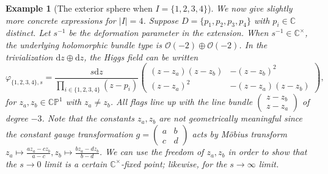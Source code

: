 \documentclass[12pt,letterpaper,reqno]{amsart}
\newtheorem{ex}[thm]{Example}
\theoremstyle{remark}
\theoremstyle{definition}
\numberwithin{thm}{section}
\numberwithin{equation}{section}
\numberwithin{figure}{section}
\newcommand{\cO}{\ensuremath{\mathcal O}}
\newcommand{\C}{\ensuremath{\mathbb C}}
\newcommand{\CP}{\ensuremath{\mathbb {CP}}}
\newcommand{\de}{\mathrm{d}}
\begin{document}
\begin{ex}[The exterior sphere when $I=\{1, 2, 3, 4\}$] We now give slightly more concrete expressions for $|I|=4$. Suppose $D=\{p_1, p_2, p_3, p_4\}$ with $p_i \in \C$ distinct.
Let $s^{-1}$ be the deformation parameter in the extension. When $s^{-1} \in \C^\times$, the underlying holomorphic bundle type is $\cO(-2) \oplus \cO(-2)$.
In the trivialization $\de z \oplus \de z$, the Higgs field can be written 
\[ \varphi_{\{1, 2, 3, 4\}, s}= \frac{s \de z}{\prod_{i \in \{1, 2, 3, 4\}}(z-p_i)} \begin{pmatrix}(z-z_a)(z-z_b)& -(z-z_b)^2 \\ (z-z_a)^2 & -(z-z_a)(z-z_b) \end{pmatrix},\]
for $z_a, z_b \in \CP^1$ with  $z_a \neq z_b$. All flags line up with the line bundle $\begin{pmatrix} z-z_b\\z-z_a \end{pmatrix}$ of degree $-3$.
Note that the constants $z_a, z_b$ are not geometrically meaningful since the constant gauge transformation $g=\begin{pmatrix} a & b \\ c & d \end{pmatrix}$ acts by M\"obius transform $z_a \mapsto \frac{a z_a - c z_b}{a-c}, z_b \mapsto \frac{b z_a - d z_b}{b -d}$. We can use the freedom of $z_a, z_b$ in order to show that the $s \to 0$ limit is a certain $\C^\times$-fixed point; likewise, for the $s \to \infty$ limit. 


\end{ex}
\end{document}
